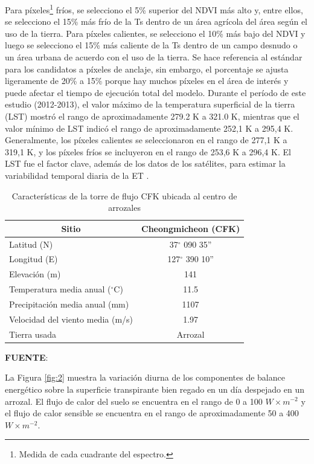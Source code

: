 Para píxeles\footnote{Medida de cada cuadrante del espectro.} fríos, se selecciono el 5\% superior del NDVI más alto y, entre ellos, se selecciono el 15\% más frío de la Ts dentro de un área agrícola del área según el uso de la tierra. Para píxeles calientes, se selecciono el 10\% más bajo del NDVI y luego se selecciono el 15\% más caliente de la Ts dentro de un campo desnudo o un área urbana de acuerdo con el uso de la tierra. Se hace referencia al estándar para los candidatos a píxeles de anclaje, sin embargo, el porcentaje se ajusta ligeramente de 20\% a 15\% porque hay muchos píxeles en el área de interés y puede afectar el tiempo de ejecución total del modelo. Durante el período de este estudio (2012-2013), el valor máximo de la temperatura superficial de la tierra (LST) mostró el rango de aproximadamente 279.2 K a 321.0 K, mientras que el valor mínimo de LST indicó el rango de aproximadamente 252,1 K a 295,4 K. Generalmente, los píxeles calientes se seleccionaron en el rango de 277,1 K a 319,1 K, y los píxeles fríos se incluyeron en el rango de 253,6 K a 296,4 K. El LST fue el factor clave, además de los datos de los satélites, para estimar la variabilidad temporal diaria de la ET \parencite{Lee2016}.

\lipsum[1]

\lipsum[3]

\begin{table}[H]
\centering
\begin{threeparttable}
\caption{Características de la torre de flujo CFK ubicada al centro de arrozales}
\label{tab:1}
\begin{tabular}{@{}lc@{}}
\hline
\multicolumn{1}{c}{Sitio} & Cheongmicheon (CFK) \\ \hline
Latitud (N) & 37$^{\circ}$ 090 35” \\
Longitud (E) & 127$^{\circ}$ 390 10” \\
Elevación (m) & 141 \\
Temperatura media anual ($^{\circ}$C) & 11.5 \\
Precipitación media anual (mm) & 1107 \\
Velocidad del viento media (m/s) & 1.97 \\
Tierra usada & Arrozal \\ \hline
\end{tabular}
    \begin{tablenotes}
    \vspace{-0.5cm}
      \item {{\fontsize{10pt}{ \baselineskip}\selectfont \textbf{FUENTE}: \parencite{Lee2016}}}
    \end{tablenotes}
\end{threeparttable}
\end{table}
\vspace{-0.6cm}
La Figura \ref{fig:2} muestra la variación diurna de los componentes de balance energético sobre la superficie transpirante bien regado en un día despejado en un arrozal. El flujo de calor del suelo se encuentra en el rango de 0 a 100 $W\times m^{-2}$ y el flujo de calor sensible se encuentra en el rango de aproximadamente 50 a 400 $W\times m^{-2}$.

